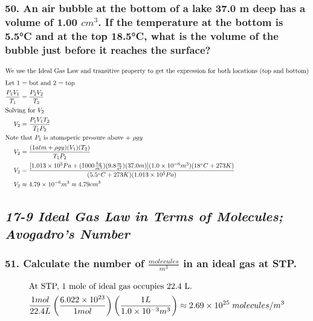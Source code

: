 \documentclass{article}
\begin{document}
\subsubsection*{
    50. An air bubble at the bottom of a lake 37.0 m deep has a volume of
    1.00 $cm^3$. If the temperature at the bottom is 5.5°C and at the top
    18.5°C, what is the volume of the bubble just before it reaches the surface?
}
\begin{align*}
    \intertext{We use the Ideal Gas Law and transitive property to get the
    expression for both locations (top and bottom)}
    \intertext{Let 1 = bot and 2 = top}
    \displaystyle\frac{P_1V_1}{T_1} &= \displaystyle\frac{P_2V_2}{T_2} \\
    \intertext{Solving for $V_2$}
    V_2 &= \displaystyle\frac{P_1V_1T_2}{T_1P_2} \\
    \intertext{Note that $P_1$ is atomsperic pressure above + $\rho gy$}
    V_2 &= \displaystyle\frac{(1atm+\rho gy)(V_1)(T_2)}{T_1P_2} \\
    V_2 &= \displaystyle\frac{[1.013\times 10^5 Pa +
        (1000\frac{kg}{m^3})(9.8\frac m {s^2})(37.0m)](1.0\times 10^{-6}m^3)(18\degree
C + 273K)}{(5.5\degree C + 273K)(1.013\times 10^5 Pa)} \\
        V_2 &\approx 4.79\times 10^{-6}m^3 \approx 4.79cm^3
\end{align*}
\begin{center}
    \subsection*{\textbf{\textit{17-9 Ideal Gas Law in Terms of Molecules;
    Avogadro's Number}}}
\end{center}
\subsubsection*{
    51. Calculate the number of $\frac{molecules}{m^3}$ in an ideal gas at STP.
}
\begin{align*}
    \intertext{At STP, 1 mole of ideal gas occupies 22.4 L.}
    \displaystyle\frac{1mol}{22.4L}\left(\displaystyle\frac{6.022\times
    10^{23}}{1mol}\right)\left(\displaystyle\frac{1L}{1.0\times 10^{-3}m^3}\right) \approx 2.69\times 10^{25}\;molecules/m^3
\end{align*}
\end{document}
